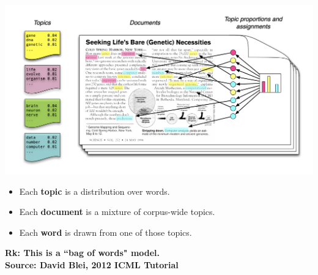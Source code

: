 \documentclass[10pt]{beamer}
\begin{document}
\begin{frame}

\begin{center}
\includegraphics[width=\textwidth]{images/lda_intro}
\end{center}


\begin{itemize}
\item Each \textbf{topic} is a distribution over words. \pause
\item Each \textbf{document} is a mixture of corpus-wide topics. \pause
\item Each \textbf{word} is drawn from one of those topics. \pause
\end{itemize}

\pause 
\vfill  \vfill \vfill


\tiny  \bf{Rk:}  This is a ``bag of words" model. \\
\pause
\hfill \tiny Source: David Blei, 2012 ICML Tutorial \normalsize
\end{frame}
\end{document}
